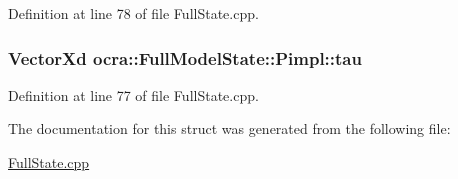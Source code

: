 Definition at line 78 of file Full\+State.\+cpp.

\subsubsection[{\texorpdfstring{tau}{tau}}]{\setlength{\rightskip}{0pt plus 5cm}Vector\+Xd ocra\+::\+Full\+Model\+State\+::\+Pimpl\+::tau}\hypertarget{structocra_1_1FullModelState_1_1Pimpl_a451de435a3d80fdc760ab0d37cbad664}{}\label{structocra_1_1FullModelState_1_1Pimpl_a451de435a3d80fdc760ab0d37cbad664}


Definition at line 77 of file Full\+State.\+cpp.



The documentation for this struct was generated from the following file\+:\begin{DoxyCompactItemize}
\item 
\hyperlink{FullState_8cpp}{Full\+State.\+cpp}\end{DoxyCompactItemize}
